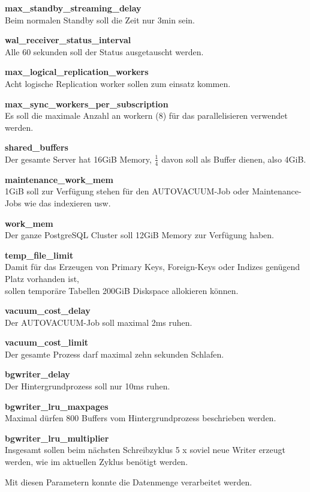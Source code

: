 \begin{flushleft}
\begin{description}
        \item \textbf{max\_standby\_streaming\_delay}\hfill \\Beim normalen Standby soll die Zeit nur 3min sein.
        \item \textbf{wal\_receiver\_status\_interval}\hfill \\Alle 60 sekunden soll der Status ausgetauscht werden.
        \item \textbf{max\_logical\_replication\_workers}\hfill \\Acht logische Replication worker sollen zum einsatz kommen.
        \item \textbf{max\_sync\_workers\_per\_subscription}\hfill \\Es soll die maximale Anzahl an workern (8) für das parallelisieren verwendet werden.
        \item \textbf{shared\_buffers}\hfill \\Der gesamte Server hat 16GiB Memory, \(\frac{1}{4}\) davon soll als Buffer dienen, also 4GiB.
        \item \textbf{maintenance\_work\_mem}\hfill \\1GiB soll zur Verfügung stehen für den \Gls{AUTOVACUUM}-Job oder Maintenance-Jobs wie das indexieren usw.
        \item \textbf{work\_mem}\hfill \\Der ganze \Gls{PostgreSQL Cluster} soll 12GiB Memory zur Verfügung haben.
        \item \textbf{temp\_file\_limit}\hfill \\Damit für das Erzeugen von Primary Keys, Foreign-Keys oder Indizes genügend Platz vorhanden ist,\\sollen temporäre Tabellen 200GiB Diskspace allokieren können.
        \item \textbf{vacuum\_cost\_delay}\hfill \\Der \Gls{AUTOVACUUM}-Job soll maximal 2ms ruhen.
        \item \textbf{vacuum\_cost\_limit}\hfill \\Der gesamte Prozess darf maximal zehn sekunden Schlafen.
        \item \textbf{bgwriter\_delay}\hfill \\Der Hintergrundprozess soll nur 10ms ruhen.
        \item \textbf{bgwriter\_lru\_maxpages}\hfill \\Maximal dürfen 800 Buffers vom Hintergrundprozess beschrieben werden.
        \item \textbf{bgwriter\_lru\_multiplier}\hfill \\Insgesamt sollen beim nächsten Schreibzyklus 5 x soviel neue Writer erzeugt werden, wie im aktuellen Zyklus benötigt werden.
    \end{description}
    Mit diesen Parametern konnte die Datenmenge verarbeitet werden.
\end{flushleft}
